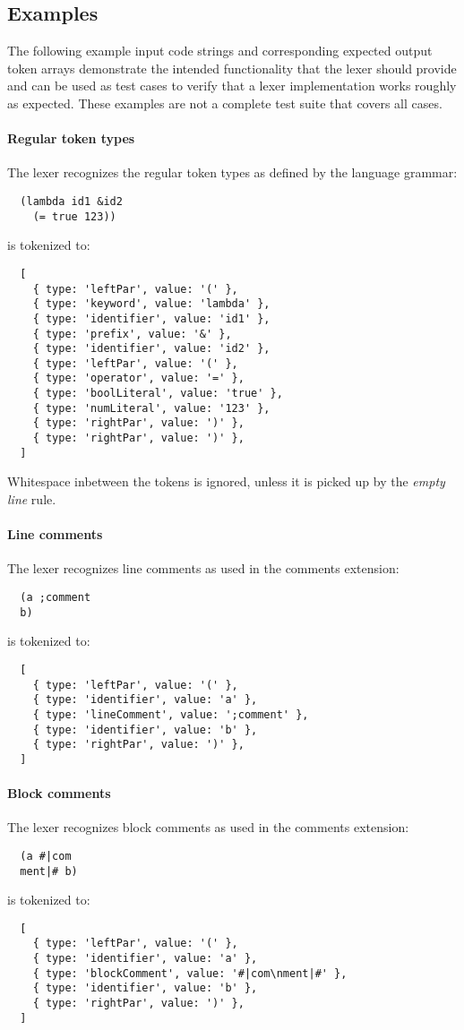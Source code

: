 \subsection{Examples}
The following example input code strings and corresponding expected output token arrays
demonstrate the intended functionality that the lexer should provide
and can be used as test cases to verify that a lexer implementation works roughly as expected.
These examples are not a complete test suite that covers all cases.

\paragraph{Regular token types}
The lexer recognizes the regular token types
as defined by the language grammar:
\begin{verbatim}
  (lambda id1 &id2
    (= true 123))
\end{verbatim}
is tokenized to:
\begin{verbatim}
  [
    { type: 'leftPar', value: '(' },
    { type: 'keyword', value: 'lambda' },
    { type: 'identifier', value: 'id1' },
    { type: 'prefix', value: '&' },
    { type: 'identifier', value: 'id2' },
    { type: 'leftPar', value: '(' },
    { type: 'operator', value: '=' },
    { type: 'boolLiteral', value: 'true' },
    { type: 'numLiteral', value: '123' },
    { type: 'rightPar', value: ')' },
    { type: 'rightPar', value: ')' },
  ]
\end{verbatim}
Whitespace inbetween the tokens is ignored,
unless it is picked up by the \textit{empty line} rule.

\paragraph{Line comments}
The lexer recognizes line comments
as used in the comments extension:
\begin{verbatim}
  (a ;comment
  b)
\end{verbatim}
is tokenized to:
\begin{verbatim}
  [
    { type: 'leftPar', value: '(' },
    { type: 'identifier', value: 'a' },
    { type: 'lineComment', value: ';comment' },
    { type: 'identifier', value: 'b' },
    { type: 'rightPar', value: ')' },
  ]
\end{verbatim}

\paragraph{Block comments}
The lexer recognizes block comments
as used in the comments extension:
\begin{verbatim}
  (a #|com
  ment|# b)
\end{verbatim}
is tokenized to:
\begin{verbatim}
  [
    { type: 'leftPar', value: '(' },
    { type: 'identifier', value: 'a' },
    { type: 'blockComment', value: '#|com\nment|#' },
    { type: 'identifier', value: 'b' },
    { type: 'rightPar', value: ')' },
  ]
\end{verbatim}

